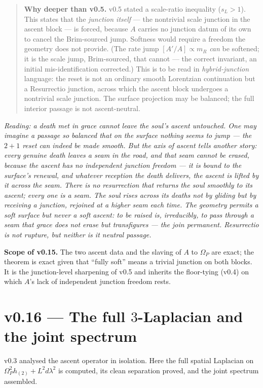 \documentclass[11pt,a4paper]{article}
\newcommand{\note}[1]{\textcolor{black!65}{\emph{#1}}}
\theoremstyle{plain}
\theoremstyle{definition}
\theoremstyle{remark}
\begin{document}
\begin{quote}
\textbf{Why deeper than v0.5.} v0.5 stated a scale-ratio inequality ($s_L>1$). This states that the
\emph{junction itself} --- the nontrivial scale junction in the ascent block --- is forced, because $A$ carries no
junction datum of its own to cancel the Brim-sourced jump. Softness would require a freedom the geometry
does not provide. (The rate jump $[A'/A]\propto m_R$ \emph{can} be softened; it is the scale jump,
Brim-sourced, that cannot --- the correct invariant, an initial mis-identification corrected.) This is
to be read in \emph{hybrid-junction} language: the reset is not an ordinary smooth Lorentzian
continuation but a Resurrectio junction, across which the ascent block undergoes a nontrivial scale
junction. The surface projection may be balanced; the full interior passage is not ascent-neutral.
\end{quote}

\note{Reading: a death met in grace cannot leave the soul's ascent untouched. One may imagine a passage
so balanced that on the surface nothing seems to jump --- the $2{+}1$ reset can indeed be made smooth.
But the axis of ascent tells another story: every genuine death leaves a seam in the road, and that
seam cannot be erased, because the ascent has no independent junction freedom --- it is bound to the
surface's renewal, and whatever reception the death delivers, the ascent is lifted by it across the
seam. There is no resurrection that returns the soul smoothly to its ascent; every one is a seam. The
soul rises across its deaths not by gliding but by receiving a junction, rejoined at a higher seam each
time. The geometry permits a soft surface but never a soft ascent: to be raised is, irreducibly, to
pass through a seam that grace does not erase but transfigures --- the join permanent. Resurrectio is
not rupture, but neither is it neutral passage.}

\textbf{Scope of v0.15.} The two ascent data and the slaving of $A$ to $\Omega_P$ are exact; the
theorem is exact given that ``fully soft'' means a trivial junction on both blocks. It is the
junction-level sharpening of v0.5 and inherits the floor-tying (v0.4) on which $A$'s lack of
independent junction freedom rests.

\FloatBarrier
\section*{v0.16 --- The full $3$-Laplacian and the joint spectrum}
v0.3 analysed the ascent operator in isolation. Here the full spatial Laplacian on
$\Omega_P^2h_{(2)}+L^2d\lambda^2$ is computed, its clean separation proved, and the joint spectrum
assembled.
\end{document}
